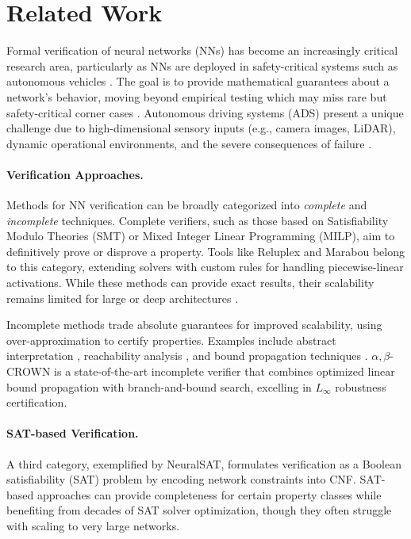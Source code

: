 \section{Related Work} \label{sec:related_work}

Formal verification of neural networks (NNs) has become an increasingly critical research area, particularly as NNs are deployed in safety-critical systems such as autonomous vehicles \cite{katz2017reluplex, liu2021algorithms}. The goal is to provide mathematical guarantees about a network's behavior, moving beyond empirical testing which may miss rare but safety-critical corner cases \cite{huang2020survey}. Autonomous driving systems (ADS) present a unique challenge due to high-dimensional sensory inputs (e.g., camera images, LiDAR), dynamic operational environments, and the severe consequences of failure \cite{tran2020verification, dreossi2019verifai}.

\paragraph{Verification Approaches.} Methods for NN verification can be broadly categorized into \emph{complete} and \emph{incomplete} techniques. Complete verifiers, such as those based on Satisfiability Modulo Theories (SMT) or Mixed Integer Linear Programming (MILP), aim to definitively prove or disprove a property. Tools like Reluplex \cite{katz2017reluplex} and Marabou \cite{katz2019marabou} belong to this category, extending solvers with custom rules for handling piecewise-linear activations. While these methods can provide exact results, their scalability remains limited for large or deep architectures \cite{gehr2018ai2, ehlers2017formal}.

Incomplete methods trade absolute guarantees for improved scalability, using over-approximation to certify properties. Examples include abstract interpretation \cite{singh2019abstract, eran}, reachability analysis \cite{huang2019reachnn}, and bound propagation techniques \cite{zhang2018efficient, xu2021fast, wang2021beta}. \(\alpha,\beta\)-CROWN \cite{wang2021beta} is a state-of-the-art incomplete verifier that combines optimized linear bound propagation with branch-and-bound search, excelling in \(L_\infty\) robustness certification.

\paragraph{SAT-based Verification.} A third category, exemplified by NeuralSAT, formulates verification as a Boolean satisfiability (SAT) problem by encoding network constraints into CNF. SAT-based approaches can provide completeness for certain property classes while benefiting from decades of SAT solver optimization, though they often struggle with scaling to very large networks.


